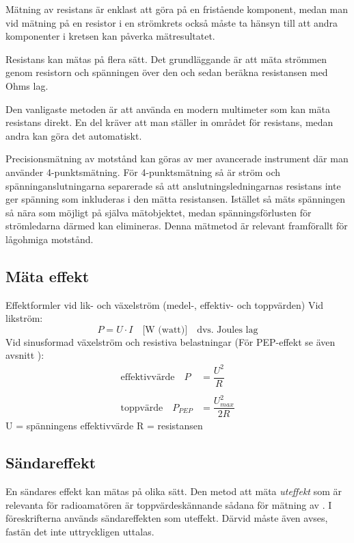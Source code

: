 Mätning av resistans är enklast att göra på en fristående komponent,
medan man vid mätning på en resistor i en strömkrets också måste ta
hänsyn till att andra komponenter i kretsen kan påverka mätresultatet.

Resistans kan mätas på flera sätt.
Det grundläggande är att mäta strömmen genom resistorn och spänningen över den
och sedan beräkna resistansen med Ohms lag.

Den vanligaste metoden är att använda en modern multimeter som kan mäta
resistans direkt.
En del kräver att man ställer in området för resistans, medan andra
kan göra det automatiskt.

Precisionsmätning av motstånd kan göras av mer avancerade instrument
där man använder 4-punkts\-mätning.
För 4-punktsmätning så är ström och spänninganslutningarna separerade
så att anslutningsledningarnas resistans inte ger spänning som inkluderas
i den mätta resistansen.
Istället så mäts spänningen så nära som möjligt på själva mätobjektet,
medan spänningsförlusten för strömledarna därmed kan elimineras.
Denna mätmetod är relevant framförallt för lågohmiga motstånd.

\subsection{Mäta effekt}
\label{mätaeffekt}

Effektformler vid lik- och växelström (medel-, effektiv- och toppvärden)
Vid likström:
%
\[
P = U \cdot I \quad \text{[W (watt)]} \quad \text{dvs. Joules lag}
\]
Vid sinusformad växelström och resistiva belastningar
(För PEP-effekt se även avsnitt ):
\[
\begin{array}{ll}
\text{effektivvärde} \quad P & = \dfrac{U^2}{R} \\
&\\
\text{toppvärde}     \quad P_{PEP} & = \dfrac{U_{max}^2}{2R}
\end{array}
\]
U = spänningens effektivvärde
R = resistansen

\subsection{Sändareffekt}

En sändares effekt kan mätas på olika sätt.
Den metod att mäta \emph{uteffekt} som är relevanta för radioamatören är
toppvärdeskännande sådana för mätning av \pep.
I föreskrifterna används sändareffekten \pep som uteffekt.
Därvid måste även \pep avses, fastän det inte uttryckligen uttalas.

